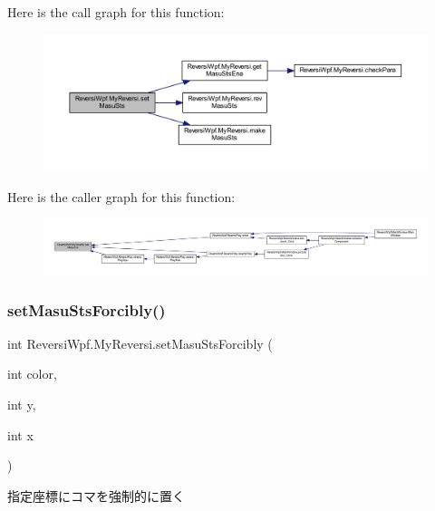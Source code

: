 Here is the call graph for this function\+:\nopagebreak
\begin{figure}[H]
\begin{center}
\leavevmode
\includegraphics[width=350pt]{class_reversi_wpf_1_1_my_reversi_a03c7e639718936243e30302680c63f99_cgraph}
\end{center}
\end{figure}
Here is the caller graph for this function\+:\nopagebreak
\begin{figure}[H]
\begin{center}
\leavevmode
\includegraphics[width=350pt]{class_reversi_wpf_1_1_my_reversi_a03c7e639718936243e30302680c63f99_icgraph}
\end{center}
\end{figure}
\mbox{\label{class_reversi_wpf_1_1_my_reversi_a6526ef12950147cd9900e0c2f8a33f1c}} 
\subsubsection{\texorpdfstring{set\+Masu\+Sts\+Forcibly()}{setMasuStsForcibly()}}
{\footnotesize\ttfamily int Reversi\+Wpf.\+My\+Reversi.\+set\+Masu\+Sts\+Forcibly (\begin{DoxyParamCaption}\item[{int}]{color,  }\item[{int}]{y,  }\item[{int}]{x }\end{DoxyParamCaption})}



指定座標にコマを強制的に置く 


